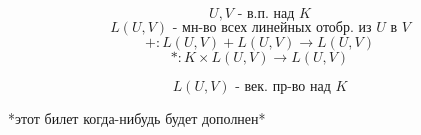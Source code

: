 \documentclass[algebra]{subfiles}
\begin{document}
    \begin{Definition}
      \[U, V \text{ - в.п. над } K\]
      \[L(U, V) \text{ - мн-во всех линейных отобр. из } U \text{ в } V\]
      \[+: L(U, V) + L(U, V) \to L(U, V)\]
      \[*: K \times L(U, V) \to L(U, V)\]
    \end{Definition}

    \begin{Theorem}
      \[L(U, V) \text{ - век. пр-во над } K\]
    \end{Theorem}

    *этот билет когда-нибудь будет дополнен*
\end{document}

